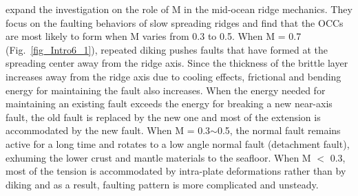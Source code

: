 \citet{Tucholke2008} expand the investigation on the role of M in the mid-ocean ridge mechanics. They focus on the faulting behaviors of slow spreading ridges and find that the OCCs are most likely to form when M varies from 0.3 to 0.5. When M = 0.7 (Fig.~\ref{fig_Intro6_1}), repeated diking pushes faults that have formed at the spreading center away from the ridge axis. Since the thickness of the brittle layer increases away from the ridge axis due to cooling effects, frictional and bending energy for maintaining the fault also increases. When the energy needed for maintaining an existing fault exceeds the energy for breaking a new near-axis fault, the old fault is replaced by the new one and most of the extension is accommodated by the new fault. When M = 0.3$\sim$0.5, the normal fault remains active for a long time and rotates to a low angle normal fault (detachment fault), exhuming the lower crust and mantle materials to the seafloor. When M $<$ 0.3, most of the tension is accommodated by intra-plate deformations rather than by diking and as a result, faulting pattern is more complicated and unsteady.

